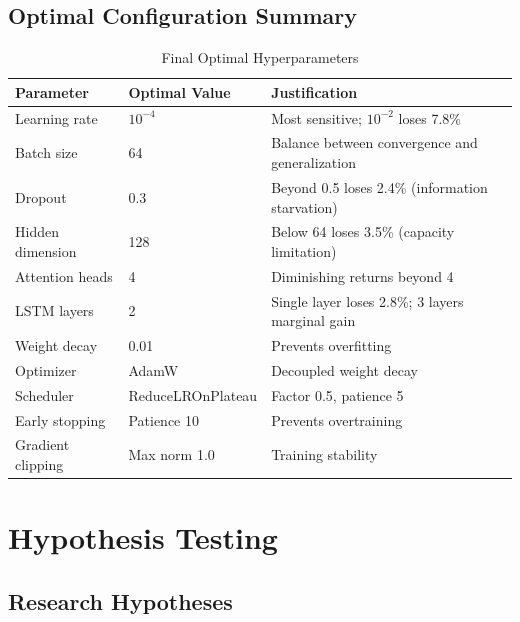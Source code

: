 \documentclass[11pt,a4paper]{article}
\begin{document}
\subsection{Optimal Configuration Summary}

\begin{table}[H]
\centering
\caption{Final Optimal Hyperparameters}
\small
\begin{tabular}{lll}
\toprule
\textbf{Parameter} & \textbf{Optimal Value} & \textbf{Justification} \\
\midrule
Learning rate & $10^{-4}$ & Most sensitive; $10^{-2}$ loses 7.8\% \\
Batch size & 64 & Balance between convergence and generalization \\
Dropout & 0.3 & Beyond 0.5 loses 2.4\% (information starvation) \\
Hidden dimension & 128 & Below 64 loses 3.5\% (capacity limitation) \\
Attention heads & 4 & Diminishing returns beyond 4 \\
LSTM layers & 2 & Single layer loses 2.8\%; 3 layers marginal gain \\
Weight decay & 0.01 & Prevents overfitting \\
Optimizer & AdamW & Decoupled weight decay \\
Scheduler & ReduceLROnPlateau & Factor 0.5, patience 5 \\
Early stopping & Patience 10 & Prevents overtraining \\
Gradient clipping & Max norm 1.0 & Training stability \\
\bottomrule
\end{tabular}
\end{table}

\section{Hypothesis Testing}

\subsection{Research Hypotheses}
\end{document}
